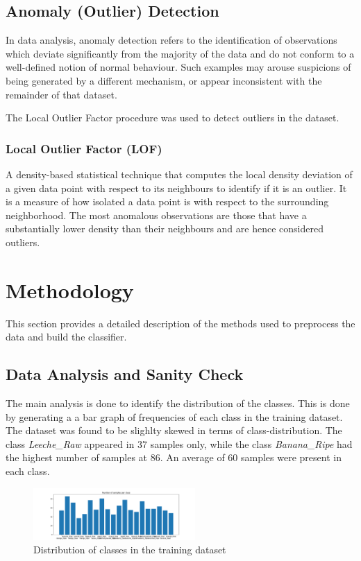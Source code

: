 \documentclass[conference]{IEEEtran}
\begin{document}
    \subsection{Anomaly (Outlier) Detection}
    \label{sec:outlier}
    In data analysis, anomaly detection refers to the identification of observations which deviate significantly from the majority of the data and
    do not conform to a well-defined notion of normal behaviour.
    Such examples may arouse suspicions of being generated by a different mechanism, or appear inconsistent with the remainder of that dataset.

    The Local Outlier Factor procedure was used to detect outliers in the dataset.
    \vspace*{3.0pt}

    \subsubsection{Local Outlier Factor (LOF)}
    \label{sec:lof}
    A density-based statistical technique that computes the local density deviation of a given data point with respect to its neighbours to identify if it is an outlier.
    It is a measure of how isolated a data point is with respect to the surrounding neighborhood.
    The most anomalous observations are those that have a substantially lower density than their neighbours and are hence considered outliers.

    \section{Methodology}
    \label{sec:methodology}
    This section provides a detailed description of the methods used to preprocess the data and build the classifier.

    \subsection{Data Analysis and Sanity Check}
    \label{sec:dataanalysis}
    The main analysis is done to identify the distribution of the classes.
    This is done by generating a a bar graph of frequencies of each class in the training dataset.
    The dataset was found to be slighlty skewed in terms of class-distribution.
    The class \textit{Leeche\_Raw} appeared in 37 samples only, while the class \textit{Banana\_Ripe} had the highest number of samples at 86.
    An average of 60 samples were present in each class.

    \begin{figure}[htbp]
        \centerline{\includegraphics[width=0.55\textwidth]{Assets/distribution.png}}
        \caption{Distribution of classes in the training dataset}
        \label{fig:distribution}
    \end{figure}
\end{document}
